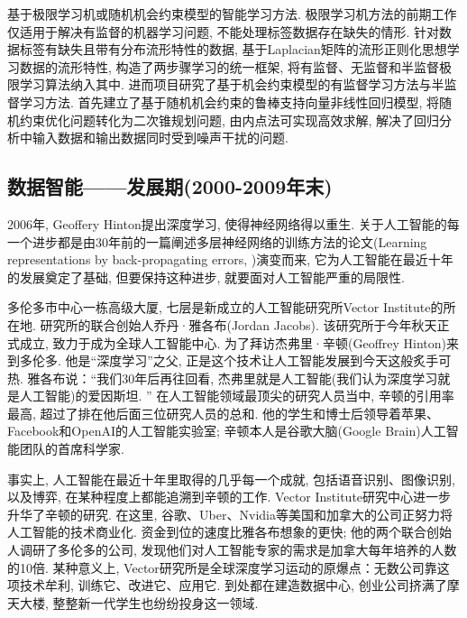       基于极限学习机或随机机会约束模型的智能学习方法.  极限学习机方法的前期工作仅适用于解决有监督的机器学习问题, 不能处理标签数据存在缺失的情形. 针对数据标签有缺失且带有分布流形特性的数据, 基于Laplacian矩阵的流形正则化思想学习数据的流形特性, 构造了两步骤学习的统一框架,  将有监督、无监督和半监督极限学习算法纳入其中. 进而项目研究了基于机会约束模型的有监督学习方法与半监督学习方法. 首先建立了基于随机机会约束的鲁棒支持向量非线性回归模型, 将随机约束优化问题转化为二次锥规划问题, 由内点法可实现高效求解, 解决了回归分析中输入数据和输出数据同时受到噪声干扰的问题.
\subsection{数据智能——发展期(2000-2009年末)}

2006年, Geoffery Hinton提出深度学习, 使得神经网络得以重生.  关于人工智能的每一个进步都是由30年前的一篇阐述多层神经网络的训练方法的论文(Learning representations by back-propagating errors, \cite{RumelhartHinton1986-9415})演变而来, 它为人工智能在最近十年的发展奠定了基础, 但要保持这种进步, 就要面对人工智能严重的局限性.

多伦多市中心一栋高级大厦, 七层是新成立的人工智能研究所Vector Institute的所在地. 研究所的联合创始人乔丹·雅各布(Jordan Jacobs). 该研究所于今年秋天正式成立, 致力于成为全球人工智能中心.  为了拜访杰弗里·辛顿(Geoffrey Hinton)来到多伦多. 他是“深度学习”之父, 正是这个技术让人工智能发展到今天这般炙手可热. 雅各布说：“我们30年后再往回看, 杰弗里就是人工智能(我们认为深度学习就是人工智能)的爱因斯坦. ” 在人工智能领域最顶尖的研究人员当中, 辛顿的引用率最高, 超过了排在他后面三位研究人员的总和. 他的学生和博士后领导着苹果、Facebook和OpenAI的人工智能实验室; 辛顿本人是谷歌大脑(Google Brain)人工智能团队的首席科学家.

事实上, 人工智能在最近十年里取得的几乎每一个成就, 包括语音识别、图像识别, 以及博弈, 在某种程度上都能追溯到辛顿的工作.
Vector Institute研究中心进一步升华了辛顿的研究. 在这里, 谷歌、Uber、Nvidia等美国和加拿大的公司正努力将人工智能的技术商业化. 资金到位的速度比雅各布想象的更快; 他的两个联合创始人调研了多伦多的公司, 发现他们对人工智能专家的需求是加拿大每年培养的人数的10倍.
某种意义上, Vector研究所是全球深度学习运动的原爆点：无数公司靠这项技术牟利, 训练它、改进它、应用它. 到处都在建造数据中心, 创业公司挤满了摩天大楼, 整整新一代学生也纷纷投身这一领域.
